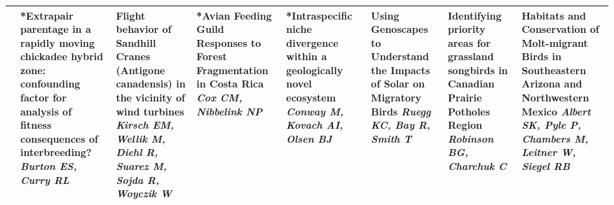 \begin{tabular}{|x{0.85cm}|a{2.85cm}|x{2.85cm}|x{2.85cm}|x{2.85cm}|a{2.85cm}|a{2.85cm}|a{2.85cm}|}
&*Extrapair parentage in a rapidly moving chickadee hybrid zone: confounding factor for analysis of fitness consequences of interbreeding? \newline \newline \textit{Burton ES, Curry RL} & Flight behavior of Sandhill Cranes (Antigone canadensis) in the vicinity of wind turbines \newline \newline \textit{Kirsch EM, Wellik M, Diehl R, Suarez M, Sojda R, Woyczik W} & *Avian Feeding Guild Responses to Forest Fragmentation in Costa Rica \newline \newline \textit{Cox CM, Nibbelink NP} & *Intraspecific niche divergence within a geologically novel ecosystem \newline \newline \textit{Conway M, Kovach AI, Olsen BJ} & Using Genoscapes to Understand the Impacts of Solar on Migratory Birds \newline \newline \textit{Ruegg KC, Bay R, Smith T} & Identifying priority areas for grassland songbirds in Canadian Prairie Potholes Region \newline \newline \textit{Robinson BG, Charchuk C} & Habitats and Conservation of Molt-migrant Birds in Southeastern Arizona and Northwestern Mexico \newline \newline \textit{Albert SK, Pyle P, Chambers M, Leitner W, Siegel RB}\\
\hline

\end{tabular}
